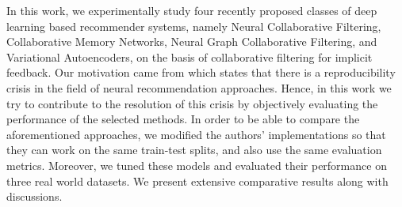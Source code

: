 In this work, we experimentally study four recently proposed classes of deep learning based recommender systems, namely Neural Collaborative Filtering, Collaborative Memory Networks, Neural Graph Collaborative Filtering, and Variational Autoencoders, on the basis of collaborative filtering for implicit feedback.
Our motivation came from \cite{dacrema2019we} which states that there is a reproducibility crisis in the field of neural recommendation approaches.
Hence, in this work we try to contribute to the resolution of this crisis by objectively evaluating the performance of the selected methods.
In order to be able to compare the aforementioned approaches, we modified the authors' implementations so that they can work on the same train-test splits, and also use the same evaluation metrics.
Moreover, we tuned these models and evaluated their performance on three real world datasets.
We present extensive comparative results along with discussions.
